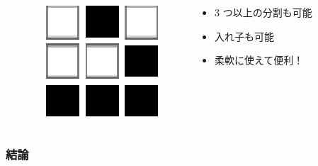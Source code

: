 \documentclass[dvipdfmx,cjk,xcolor=dvipsnames,envcountsect,notheorems,12pt]{beamer}
\theoremstyle{definition}
\begin{document}
\begin{frame}
\begin{columns}
\begin{column}{0.4\textwidth}
\begin{columns}
\begin{column}{0.33\textwidth}
        \end{column}
        \begin{column}{0.33\textwidth}
          \includegraphics[width=\textwidth]{sample-image.eps}
        \end{column}
      \end{columns}
    \end{column}
    \begin{column}{0.6\textwidth}
      \begin{itemize}
      \item 3 つ以上の分割も可能
      \item 入れ子も可能
      \item 柔軟に使えて便利！
      \end{itemize}
    \end{column}
  \end{columns}
\end{frame}

\begin{frame}
	\frametitle{結論}
	\large

	\pause

	\Huge
\end{frame}

\end{document}
